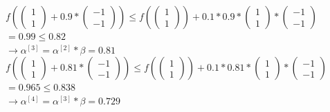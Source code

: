 \documentclass[naustrian]{article}
\begin{document}
{\begin{enumerate}
	$f( \left( \begin{array}{c} 1 \\ 1 \end{array} \right) + 0.9 * \left( \begin{array}{c} -1 \\ -1 \end{array} \right)) \leq f(\left( \begin{array}{c} 1 \\ 1 \end{array} \right)) + 0.1 * 0.9 *  \left( \begin{array}{c} 1 \\ 1 \end{array} \right) * \left( \begin{array}{c} -1 \\ -1 \end{array} \right)$ \\
	$= 0.99 \leq 0.82$ \\
	$\rightarrow \alpha^{[3]} = \alpha^{[2]} * \beta = 0.81$ \\

	$f( \left( \begin{array}{c} 1 \\ 1 \end{array} \right) + 0.81 * \left( \begin{array}{c} -1 \\ -1 \end{array} \right)) \leq f(\left( \begin{array}{c} 1 \\ 1 \end{array} \right)) + 0.1 * 0.81 *  \left( \begin{array}{c} 1 \\ 1 \end{array} \right) * \left( \begin{array}{c} -1 \\ -1 \end{array} \right)$ \\
	$= 0.965 \leq 0.838$ \\
	$\rightarrow \alpha^{[4]} = \alpha^{[3]} * \beta = 0.729$ \\


\end{enumerate}}
\end{document}
